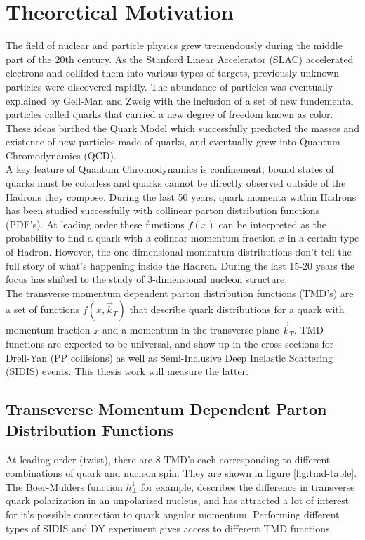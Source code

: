 \section{Theoretical Motivation}

The field of nuclear and particle physics grew tremendously during the middle part of the 20th century.  As the Stanford Linear Accelerator (SLAC) accelerated electrons and collided them into various types of targets, previously unknown particles were discovered rapidly.  The abundance of particles was eventually explained by Gell-Man and Zweig with the inclusion of a set of new fundemental particles called quarks that carried a new degree of freedom known as color.  These ideas birthed the Quark Model which successfully predicted the masses and existence of new particles made of quarks, and eventually grew into Quantum Chromodynamics (QCD).  \\

A key feature of Quantum Chromodynamics is confinement; bound states of quarks must be colorless and quarks cannot be directly observed outside of the Hadrons they compose.  During the last 50 years, quark momenta within Hadrons has been studied successfully with collinear parton distribution functions (PDF's).  At leading order these functions $f(x)$ can be interpreted as the probability to find a quark with a colinear momentum fraction $x$ in a certain type of Hadron.  However, the one dimensional momentum distributions don't tell the full story of what's happening inside the Hadron.  During the last 15-20 years the focus has shifted to the study of 3-dimensional nucleon structure. \\

The transverse momentum dependent parton distribution functions (TMD's) are a set of functions $f(x, \vec{k}_{T})$ that describe quark distributions for a quark with momentum fraction $x$ and a momentum in the transverse plane $\vec{k}_{T}$.  TMD functions are expected to be universal, and show up in the cross sections for Drell-Yan (PP collisions) as well as Semi-Inclusive Deep Inelastic Scattering (SIDIS) events.  This thesis work will measure the latter.  

\subsection{Transeverse Momentum Dependent Parton Distribution Functions}

At leading order (twist), there are 8 TMD's each corresponding to different combinations of quark and nucleon spin.  They are shown in figure \ref{fig:tmd-table}.  The Boer-Mulders function $h^{1}_{\perp}$ for example, describes the difference in transverse quark polarization in an unpolarized nucleus, and has attracted a lot of interest for it's possible connection to quark angular momentum.  Performing different types of SIDIS and DY experiment gives access to different TMD functions.  

